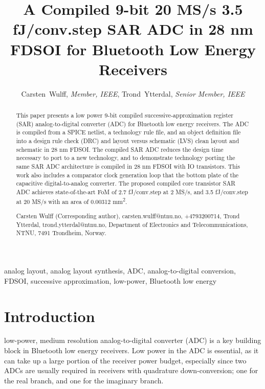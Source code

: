


\newcommand{\technm}{28 nm FDSOI}

\title{A Compiled 9-bit 20 MS/s 3.5 fJ/conv.step SAR ADC in {\technm} for
  Bluetooth Low Energy Receivers}
%
\author{Carsten~Wulff, \textit{Member, IEEE},
  Trond~Ytterdal, \textit{Senior Member, IEEE} }


\maketitle


\begin{abstract}
This paper presents a low power 9-bit compiled
successive-approximation register (SAR) analog-to-digital converter (ADC) for
Bluetooth low energy receivers. The
ADC is compiled from a SPICE netlist, a technology rule file, and an object definition file
into a design rule check (DRC) and layout versus schematic (LVS) clean layout and schematic in {\technm}. The compiled SAR ADC
reduces the design time necessary to port to a new
technology, and to demonstrate
technology porting the same SAR ADC architecture is compiled in {\technm}
with IO transistors. This work also includes a comparator
clock generation loop that  the bottom plate of the capacitive
digital-to-analog converter.  The proposed
compiled core transistor SAR ADC achieves state-of-the-art FoM of 2.7
fJ/conv.step at 2 MS/s, and 3.5 fJ/conv.step at
20 MS/s with an area of 0.00312 mm\textsuperscript{2}.

Carsten Wulff (Corresponding author), carsten.wulff@ntnu.no,
+4793200714, Trond Ytterdal, trond.ytterdal@ntnu.no,  Department of Electronics and Telecommunications, NTNU,
7491 Trondheim, Norway.
\end{abstract}
\begin{IEEEkeywords}
analog layout,  analog layout synthesis, ADC, analog-to-digital
conversion, FDSOI, successive approximation, low-power, Bluetooth low energy
\end{IEEEkeywords}

\section{Introduction} \label{introduction}

 low-power, medium resolution analog-to-digital converter (ADC) is a key building block in
Bluetooth\textsuperscript{\textregistered} low energy \cite{ble} receivers. Low
power in the ADC is essential, as it can take up a large portion of the
receiver power budget, especially since two ADCs are usually required in receivers with quadrature down-conversion; one for
the real branch, and one for the imaginary branch.

